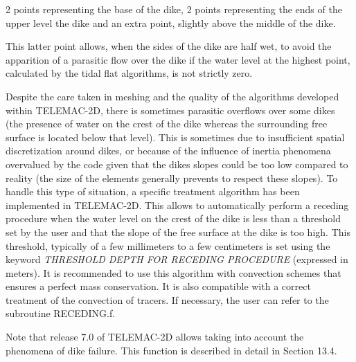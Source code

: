  2 points representing the base of the dike, 2 points representing the ends of the upper level the dike and an extra point, slightly above the middle of the dike.



 This latter point allows, when the sides of the dike are half wet, to avoid the apparition of a parasitic flow over the dike if the water level at the highest point, calculated by the tidal flat algorithms, is not strictly zero.

 Despite the care taken in meshing and the quality of the algorithms developed within TELEMAC-2D, there is sometimes parasitic overflows over some dikes (the presence of water on the crest of the dike whereas the surrounding free surface is located below that level). This is sometimes due to insufficient spatial discretization around dikes, or because of the influence of inertia phenomena overvalued by the code given that the dikes slopes could be too low compared to reality (the size of the elements generally prevents to respect these slopes). To handle this type of situation, a specific treatment algorithm has been implemented in TELEMAC-2D. This allows to automatically perform a receding procedure when the water level on the crest of the dike is less than a threshold set by the user and that the slope of the free surface at the dike is too high. This threshold, typically of a few millimeters to a few centimeters is set using the keyword \textit{THRESHOLD DEPTH FOR RECEDING PROCEDURE} (expressed in meters). It is recommended to use this algorithm with  convection schemes that ensures a perfect mass conservation. It is also compatible with a correct treatment of the convection of tracers. If necessary, the user can refer to the subroutine RECEDING.f.

 Note that release 7.0 of TELEMAC-2D allows taking into account the phenomena of dike failure. This function is described in detail in Section 13.4.


